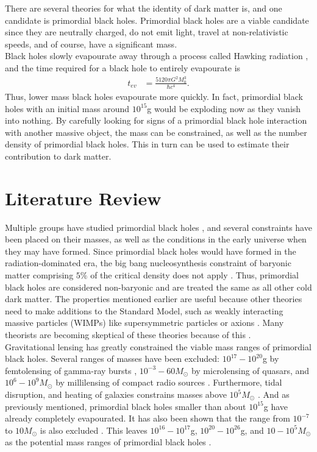 There are several theories for what the identity of dark matter is, and one candidate is primordial black holes. Primordial black holes are a viable candidate since they are neutrally charged, do not emit light, travel at non-relativistic speeds, and of course, have a significant mass. \\

Black holes slowly evapourate away through a process called Hawking radiation \cite{hawking}, and the time required for a black hole to entirely evapourate is 
\begin{align*}
t_{ev} &= \frac{5120 \pi G^2 M_0^3}{\hbar c^4}.
\end{align*}
Thus, lower mass black holes evapourate more quickly. In fact, primordial black holes with an initial mass around $10^{15}$g would be exploding now as they vanish into nothing. By carefully looking for signs of a primordial black hole interaction with another massive object, the mass can be constrained, as well as the number density of primordial black holes. This in turn can be used to estimate their contribution to dark matter.

\section{Literature Review}

Multiple groups have studied primordial black holes \cite{bigpaper}, and several constraints have been placed on their masses, as well as the conditions in the early universe when they may have formed. Since primordial black holes would have formed in the radiation-dominated era, the big bang nucleosynthesis constraint of baryonic matter comprising $5\%$ of the critical density does not apply \cite{critdens, cosmology}. Thus, primordial black holes are considered non-baryonic and are treated the same as all other cold dark matter. The properties mentioned earlier are useful because other theories need to make additions to the Standard Model, such as weakly interacting massive particles (WIMPs) like supersymmetric particles or axions \cite{supersym}. Many theorists are becoming skeptical of these theories because of this \cite{pessimism}. \\

Gravitational lensing has greatly constrained the viable mass ranges of primordial black holes. Several ranges of masses have been excluded: $10^{17}-10^{20}$g by femtolensing of gamma-ray bursts \cite{massfemt}, $10^{-3}-60 M_\odot$ by microlensing of quasars, and $10^6-10^9 M_\odot$ by millilensing of compact radio sources \cite{massmilli}. Furthermore, tidal disruption, and heating of galaxies constrains masses above $10^5 M_\odot$ \cite{massheavy}. And as previously mentioned, primordial black holes smaller than about $10^{15}$g have already completely evapourated. It has also been shown that the range from $10^{-7}$ to $10 M_\odot$ is also excluded \cite{mass1}. This leaves $10^{16}-10^{17}$g, $10^{20}-10^{26}$g, and $10-10^{5}M_\odot$ as the potential mass ranges of primordial black holes \cite{massrange}. \\

